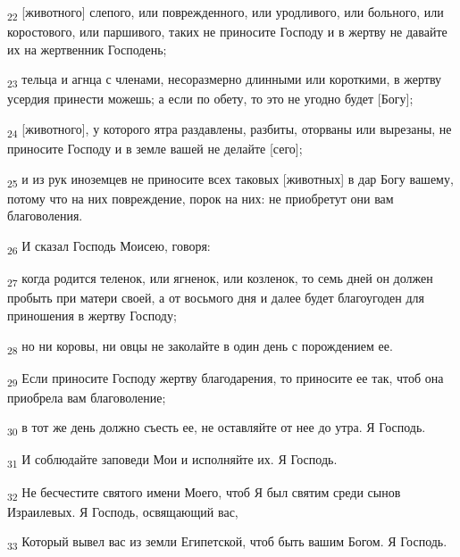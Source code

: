 \begin{tcolorbox}
\textsubscript{22} [животного] слепого, или поврежденного, или уродливого, или больного, или коростового, или паршивого, таких не приносите Господу и в жертву не давайте их на жертвенник Господень;
\end{tcolorbox}
\begin{tcolorbox}
\textsubscript{23} тельца и агнца с членами, несоразмерно длинными или короткими, в жертву усердия принести можешь; а если по обету, то это не угодно будет [Богу];
\end{tcolorbox}
\begin{tcolorbox}
\textsubscript{24} [животного], у которого ятра раздавлены, разбиты, оторваны или вырезаны, не приносите Господу и в земле вашей не делайте [сего];
\end{tcolorbox}
\begin{tcolorbox}
\textsubscript{25} и из рук иноземцев не приносите всех таковых [животных] в дар Богу вашему, потому что на них повреждение, порок на них: не приобретут они вам благоволения.
\end{tcolorbox}
\begin{tcolorbox}
\textsubscript{26} И сказал Господь Моисею, говоря:
\end{tcolorbox}
\begin{tcolorbox}
\textsubscript{27} когда родится теленок, или ягненок, или козленок, то семь дней он должен пробыть при матери своей, а от восьмого дня и далее будет благоугоден для приношения в жертву Господу;
\end{tcolorbox}
\begin{tcolorbox}
\textsubscript{28} но ни коровы, ни овцы не заколайте в один день с порождением ее.
\end{tcolorbox}
\begin{tcolorbox}
\textsubscript{29} Если приносите Господу жертву благодарения, то приносите ее так, чтоб она приобрела вам благоволение;
\end{tcolorbox}
\begin{tcolorbox}
\textsubscript{30} в тот же день должно съесть ее, не оставляйте от нее до утра. Я Господь.
\end{tcolorbox}
\begin{tcolorbox}
\textsubscript{31} И соблюдайте заповеди Мои и исполняйте их. Я Господь.
\end{tcolorbox}
\begin{tcolorbox}
\textsubscript{32} Не бесчестите святого имени Моего, чтоб Я был святим среди сынов Израилевых. Я Господь, освящающий вас,
\end{tcolorbox}
\begin{tcolorbox}
\textsubscript{33} Который вывел вас из земли Египетской, чтоб быть вашим Богом. Я Господь.
\end{tcolorbox}
